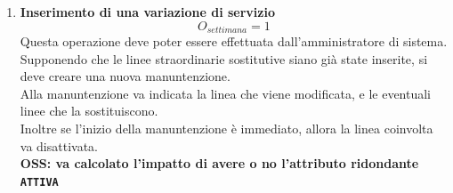 \documentclass[12pt,a4paper]{report}
\begin{document}
\begin{enumerate}[label=\textbf{\arabic*)}]
    \item\textbf{Inserimento di una variazione di servizio} \label{op19} \\
	\[{O_{settimana} = 1}\]
	Questa operazione deve poter essere effettuata dall'amministratore di sistema.\\
	Supponendo che le linee straordinarie sostitutive siano già state inserite, si deve creare una nuova manuntenzione.\\
	Alla manuntenzione va indicata la linea che viene modificata, e le eventuali linee che la sostituiscono.\\
	Inoltre se l'inizio della manuntenzione è immediato, allora la linea coinvolta va disattivata.\\
	\textbf{OSS: va calcolato l'impatto di avere o no l'attributo ridondante \texttt{ATTIVA}}


\end{enumerate}
\end{document}

